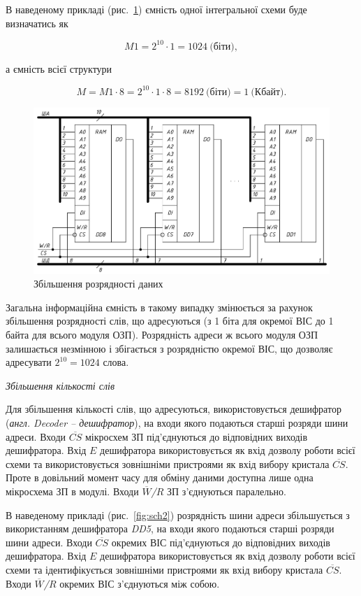 В наведеному прикладі (рис.~\ref{fig:sch1}) ємність одної інтегральної схеми буде визначатись як 

$$M1 = 2^{10}\cdot1 = 1024~\text{(біти)},$$

\noindent
а ємність всієї структури

$$M = M1\cdot8 = 2^{10}\cdot1\cdot8 = 8192~\text{(біти)} = 1~\text{(Кбайт)}.$$

\begin{figure}[h]
\centering
\includegraphics[width=\textwidth]{img/sch1-crop.pdf}
\caption{Збільшення розрядності даних}
\label{fig:sch1}
\end{figure}

Загальна інформаційна ємність в такому випадку змінюється за рахунок збільшення розрядності слів, що адресуються (з 1 біта для окремої ВІС до 1 байта для всього модуля ОЗП). Розрядність адреси ж всього модуля ОЗП залишається незмінною і збігається з розрядністю окремої ВІС, що дозволяє адресувати $2^{10} = 1024$ слова.  

\begin{center}
\textit{Збільшення кількості слів}
\end{center}

Для збільшення кількості слів, що адресуються, ви\-ко\-рис\-то\-ву\-єть\-ся дешифратор (\textit{англ. Decoder -- дешифратор}), на входи якого по\-да\-ють\-ся старші розряди шини адреси. Входи $\overline{CS}$ мікросхем ЗП під'єд\-ну\-ють\-ся до відповідних виходів дешифратора. Вхід $E$ дешифратора використовується як вхід дозволу роботи всієї схеми та використовується зовнішніми пристроями як вхід вибору кристала $\overline{CS}$. Проте в довільний момент часу для обміну даними доступна лише одна мікросхема ЗП в модулі. Входи \textit{$\overline{W}\!\!$/$R$} ЗП з'єднуються паралельно.

В наведеному прикладі (рис.~\ref{fig:sch2}) розрядність шини адреси збільшується з використанням дешифратора \textit{DD5}, на входи якого подаються старші розряди шини адреси. Входи $\overline{CS}$ окремих ВІС під'єднуються до відповідних виходів дешифратора. Вхід $E$ дешифратора використовується як вхід дозволу роботи всієї схеми та ідентифікується зовнішніми пристроями як вхід вибору кристала $\overline{CS}$. Входи \textit{$\overline{W}\!\!$/$R$} окремих ВІС з'єднуються між собою.

